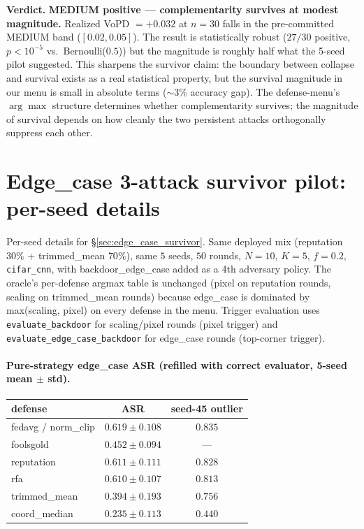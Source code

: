 \documentclass{article}
\begin{document}
\textbf{Verdict.} \textbf{MEDIUM positive --- complementarity survives at modest magnitude.} Realized VoPD $= +0.032$ at $n=30$ falls in the pre-committed MEDIUM band ($[0.02, 0.05]$). The result is statistically robust ($27/30$ positive, $p < 10^{-5}$ vs.\ Bernoulli($0.5$)) but the magnitude is roughly half what the 5-seed pilot suggested. This sharpens the survivor claim: the boundary between collapse and survival exists as a real statistical property, but the survival magnitude in our menu is small in absolute terms ($\sim 3\%$ accuracy gap). The defense-menu's $\arg\max$ structure determines whether complementarity survives; the magnitude of survival depends on how cleanly the two persistent attacks orthogonally suppress each other.

\section{Edge\_case 3-attack survivor pilot: per-seed details}
\label{app:edge_case_survivor_details}

Per-seed details for §\ref{sec:edge_case_survivor}. Same deployed mix (reputation $30\%$ + trimmed\_mean $70\%$), same $5$ seeds, $50$ rounds, $N{=}10$, $K{=}5$, $f{=}0.2$, \texttt{cifar\_cnn}, with backdoor\_edge\_case added as a 4th adversary policy. The oracle's per-defense argmax table is unchanged (pixel on reputation rounds, scaling on trimmed\_mean rounds) because edge\_case is dominated by max(scaling, pixel) on every defense in the menu. Trigger evaluation uses \texttt{evaluate\_backdoor} for scaling/pixel rounds (pixel trigger) and \texttt{evaluate\_edge\_case\_backdoor} for edge\_case rounds (top-corner trigger).

\paragraph{Pure-strategy edge\_case ASR (refilled with correct evaluator, 5-seed mean $\pm$ std).}
\begin{center}\small
\begin{tabular}{l|c|c}
\toprule
defense & ASR & seed-45 outlier \\
\midrule
fedavg / norm\_clip   & $0.619 \pm 0.108$ & $0.835$ \\
foolsgold    & $0.452 \pm 0.094$ & --- \\
reputation   & $0.611 \pm 0.111$ & $0.828$ \\
rfa          & $0.610 \pm 0.107$ & $0.813$ \\
trimmed\_mean & $\mathbf{0.394 \pm 0.193}$ & $0.756$ \\
coord\_median & $\mathbf{0.235 \pm 0.113}$ & $0.440$ \\
\bottomrule
\end{tabular}
\end{center}
\end{document}
